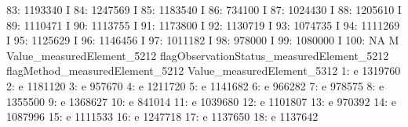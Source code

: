 \documentclass[nojss]{jss}
\begin{document}
\begin{Schunk}
\begin{Soutput}
 83:                    1193340                                          I
 84:                    1247569                                          I
 85:                    1183540                                          I
 86:                     734100                                          I
 87:                    1024430                                          I
 88:                    1205610                                          I
 89:                    1110471                                          I
 90:                    1113755                                          I
 91:                    1173800                                          I
 92:                    1130719                                          I
 93:                    1074735                                          I
 94:                    1111269                                          I
 95:                    1125629                                          I
 96:                    1146456                                          I
 97:                    1011182                                          I
 98:                     978000                                          I
 99:                    1080000                                          I
100:                         NA                                          M
     Value_measuredElement_5212 flagObservationStatus_measuredElement_5212
     flagMethod_measuredElement_5212 Value_measuredElement_5312
  1:                               e                    1319760
  2:                               e                    1181120
  3:                               e                     957670
  4:                               e                    1211720
  5:                               e                    1141682
  6:                               e                     966282
  7:                               e                     978575
  8:                               e                    1355500
  9:                               e                    1368627
 10:                               e                     841014
 11:                               e                    1039680
 12:                               e                    1101807
 13:                               e                     970392
 14:                               e                    1087996
 15:                               e                    1111533
 16:                               e                    1247718
 17:                               e                    1137650
 18:                               e                    1137642

\end{Soutput}
\end{Schunk}
\end{document}
